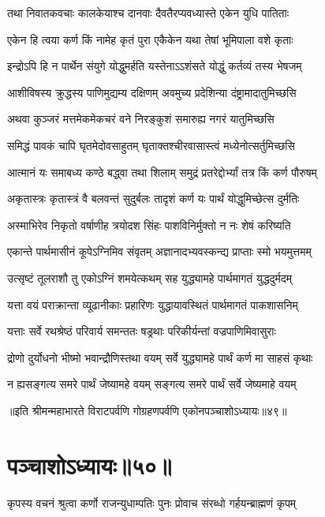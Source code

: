 \twolineshloka
{तथा निवातकवचाः कालकेयाश्च दानवाः}
{दैवतैरप्यवध्यास्ते एकेन युधि पातिताः}


\twolineshloka
{एकेन हि त्वया कर्ण किं नामेह कृतं पुरा}
{एकैकेन यथा तेषां भूमिपाला वशे कृताः}


\twolineshloka
{इन्द्रोऽपि हि न पार्थेन संयुगे योद्धुमर्हति}
{यस्तेनाऽऽशंसते योद्धुं कर्तव्यं तस्य भेषजम्}


\twolineshloka
{आशीविषस्य क्रुद्धस्य पाणिमुद्यम्य दक्षिणम्}
{अवमुच्य प्रदेशिन्या दंष्ट्रामादातुमिच्छसि}


\twolineshloka
{अथवा कुञ्जरं मत्तमेकमेकचरं वने}
{निरङ्कुशं समारुह्य नगरं यातुमिच्छसि}


\twolineshloka
{समिद्धं पावकं चापि घृतमेदोवसाहुतम्}
{घृताक्तश्चीरवासास्त्वं मध्येनोत्सर्तुमिच्छसि}


\twolineshloka
{आत्मानं यः समाबध्य कण्ठे बद्ध्वा तथा शिलाम्}
{समुद्रं प्रतरेद्दोर्भ्यां तत्र किं कर्ण पौरुषम्}


\twolineshloka
{अकृतास्त्रः कृतास्त्रं वै बलवन्तं सुदुर्बलः}
{तादृशं कर्ण यः पार्थं योद्धुमिच्छेत्स दुर्मतिः}


\twolineshloka
{अस्माभिरेव निकृतो वर्षाणीह त्रयोदश}
{सिंहः पाशविनिर्मुक्तो न नः शेषं करिष्यति}


\twolineshloka
{एकान्ते पार्थमासीनं कूपेऽग्निमिव संवृतम्}
{अज्ञानादभ्यवस्कन्द्य प्राप्ताः स्मो भयमुत्तमम्}


\twolineshloka
{उत्सृष्टं तूलराशौ तु एकोऽग्निं शमयेत्कथम्}
{सह युद्ध्यामहे पार्थमागतं युद्धदुर्मदम्}


\twolineshloka
{यत्ता वयं पराक्रान्ता व्यूढानीकाः प्रहारिणः}
{युद्धायावस्थितं पार्थमागतं पाकशासनिम्}


\twolineshloka
{यत्ताः सर्वे रथश्रेष्ठं परिवार्य समन्ततः}
{षड्रथाः परिकीर्यन्तां वज्रपाणिमिवासुराः}


\twolineshloka
{द्रोणो दुर्योधनो भीष्मो भवान्द्रौणिस्तथा वयम्}
{सर्वे युद्ध्यामहे पार्थं कर्ण मा साहसं कृथाः}


\twolineshloka
{न ह्यसङ्गत्य समरे पार्थं जेष्यामहे वयम्}
{सङ्गत्य समरे पार्थं सर्वे जेष्यमाहे वयम्}

॥इति श्रीमन्महाभारते विराटपर्वणि गोग्रहणपर्वणि एकोनपञ्चाशोऽध्यायः॥४९॥

\chapter{पञ्चाशोऽध्यायः॥५०॥}

\twolineshloka
{कृपस्य वचनं श्रुत्वा कर्णो राजन्युधाम्पतिः}
{पुनः प्रोवाच संरब्धो गर्हयन्ब्राह्मणं कृपम्}

